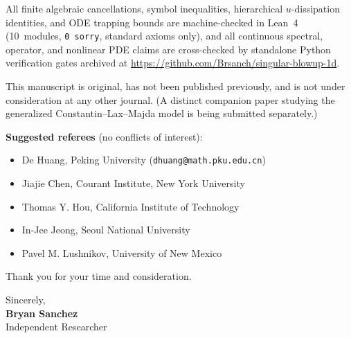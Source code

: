 \documentclass[10.5pt,letterpaper]{article}
\begin{document}
All finite algebraic cancellations, symbol inequalities, hierarchical $u$-dissipation identities, and ODE trapping bounds are machine-checked in Lean~4 (10~modules, \texttt{0~sorry}, standard axioms only), and all continuous spectral, operator, and nonlinear PDE claims are cross-checked by standalone Python verification gates archived at \url{https://github.com/Brsanch/singular-blowup-1d}.

This manuscript is original, has not been published previously, and is not under consideration at any other journal. (A distinct companion paper studying the generalized Constantin--Lax--Majda model is being submitted separately.)

\textbf{Suggested referees} (no conflicts of interest):
\begin{itemize}
  \item De Huang, Peking University (\texttt{dhuang@math.pku.edu.cn})
  \item Jiajie Chen, Courant Institute, New York University
  \item Thomas Y. Hou, California Institute of Technology
  \item In-Jee Jeong, Seoul National University
  \item Pavel M. Lushnikov, University of New Mexico
\end{itemize}

Thank you for your time and consideration.

\vspace{0.5em}
Sincerely,\\[0.3em]
\textbf{Bryan Sanchez}\\
Independent Researcher
\end{document}
